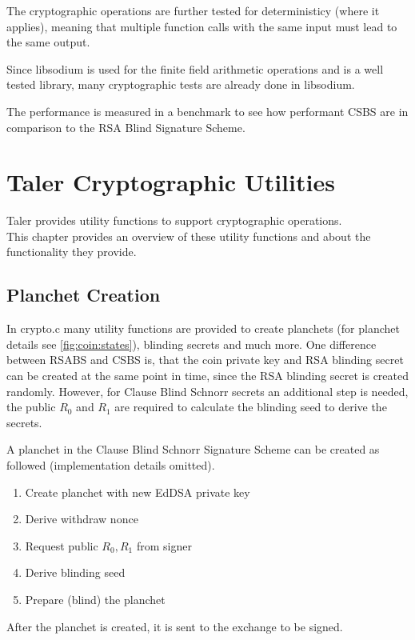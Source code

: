 The cryptographic operations are further tested for deterministicy (where it applies), meaning that multiple function calls with the same input must lead to the same output.

Since libsodium is used for the finite field arithmetic operations and is a well tested library, many cryptographic tests are already done in libsodium.

The performance is measured in a benchmark to see how performant \gls{CSBS} are in comparison to the RSA Blind Signature Scheme.

\section{Taler Cryptographic Utilities}
Taler provides utility functions to support cryptographic operations.\\
This chapter provides an overview of these utility functions and about the functionality they provide.

\subsection{Planchet Creation}
In crypto.c many utility functions are provided to create planchets (for planchet details see \ref{fig:coin:states}), blinding secrets and much more.
One difference between \gls{RSABS} and \gls{CSBS} is, that the coin private key and RSA blinding secret can be created at the same point in time, since the RSA blinding secret is created randomly.
However, for Clause Blind Schnorr secrets an additional step is needed, the public $R_0$ and $R_1$ are required to calculate the blinding seed to derive the secrets.

A planchet in the Clause Blind Schnorr Signature Scheme can be created as followed (implementation details omitted).

\begin{enumerate}
  \item Create planchet with new \ac{EdDSA} private key
  \item Derive withdraw nonce
  \item Request public $R_0, R_1$ from signer
  \item Derive blinding seed
  \item Prepare (blind) the planchet
\end{enumerate}

After the planchet is created, it is sent to the exchange to be signed.

